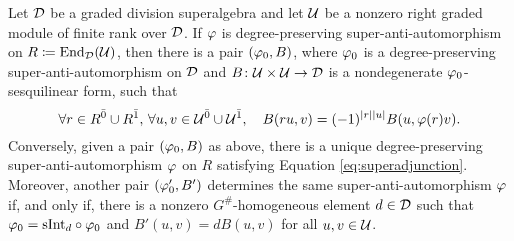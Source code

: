 





\begin{thm}\label{thm:vphi-iff-vphi0-and-B}
    Let $\mathcal{D}$ be a graded division superalgebra and let $\mathcal U$ be a nonzero right graded module of finite rank over $\mathcal{D}$. 
    If $\varphi$ is degree-preserving super-anti-automorphism on $R \coloneqq \operatorname{End}_{\mathcal{D}}(\mathcal U)$, then there is a pair $(\varphi_0, B)$, where $\varphi_0$ is a degree-preserving super-anti-automorphism on $\mathcal{D}$ and $B\colon \mathcal U \times \mathcal U \to \mathcal{D}$ is a nondegenerate $\varphi_0$-sesquilinear form, such that
    \begin{equation}\label{eq:superadjunction}
        \forall r\in R^{\bar0} \cup R^{\bar1},\,\forall u, v \in \mathcal U^{\bar0} \cup \mathcal U^{\bar1},  \quad B(ru,v) = (-1)^{|r||u|} B(u,\varphi(r)v).
    \end{equation}
    Conversely, given a pair $(\varphi_0, B)$ as above, there is a unique degree-preserving super-anti-automorphism $\varphi$ on $R$ satisfying Equation \eqref{eq:superadjunction}. 
    Moreover, another pair $(\varphi_0', B')$ determines the same super-anti-automorphism $\varphi$ if, and only if, there is a nonzero $G^\#$-homogeneous element $d\in \mathcal{D}$ such that $\varphi_0 = \mathrm{sInt}_d \circ \varphi_0$ and $B'(u, v) = dB (u, v)$ for all $u, v \in \mathcal U$.
\end{thm}


